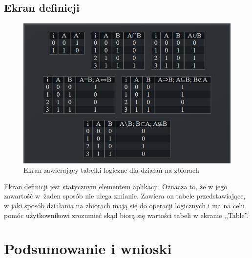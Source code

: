 \documentclass{SGGW-thesis}
\begin{document}
\section{Ekran definicji}

\begin{figure}[h]
    \hspace{1.5cm}
    \includegraphics{screenshots/definitions.png}
    \caption{Ekran zawierający tabelki logiczne dla działań na zbiorach}
    \label{fig:definitions}
\end{figure}

\begin{paragraph}{}
    Ekran definicji jest statycznym elementem aplikacji. Oznacza to, że w jego zawartość w~żaden sposób nie ulega zmianie. Zawiera on tabele przedstawiające, w jaki sposób działania na zbiorach mają się do operacji logicznych i ma na celu pomóc użytkownikowi zrozumieć skąd biorą się wartości tabeli w ekranie ,,Table''.
\end{paragraph}

\chapter{Podsumowanie i wnioski}
\end{document}
